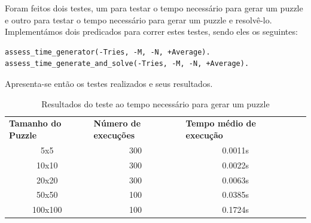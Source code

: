\documentclass[runningheads,a4paper]{llncs}
\begin{document}
Foram feitos dois testes, um para testar o tempo necessário para gerar um puzzle e outro para testar o tempo necessário para gerar um puzzle e resolvê-lo. Implementámos dois predicados para correr estes testes, sendo eles os seguintes:

\begin{lstlisting}
assess_time_generator(-Tries, -M, -N, +Average).
assess_time_generate_and_solve(-Tries, -M, -N, +Average).
\end{lstlisting}

Apresenta-se então os testes realizados e seus resultados.

\begin{table}[]
\begin{tabular}{cccll}
\multicolumn{1}{l}{\textbf{Tamanho do Puzzle}} & \multicolumn{1}{l}{\textbf{Número de execuções}} & \multicolumn{1}{l}{\textbf{Tempo médio de execução}} &  &  \\
5x5                                            & 300                                              & 0.0011s                                               &  &  \\
10x10                                          & 300                                              & 0.0022s                                               &  &  \\
20x20                                          & 300                                              & 0.0063s                                               &  &  \\
50x50                                          & 100                                              & 0.0385s                                               &  &  \\
100x100                                        & 100                                               & 0.1724s                                               &  & 
\end{tabular}
\caption{Resultados do teste ao tempo necessário para gerar um puzzle}
\end{table}
\end{document}
